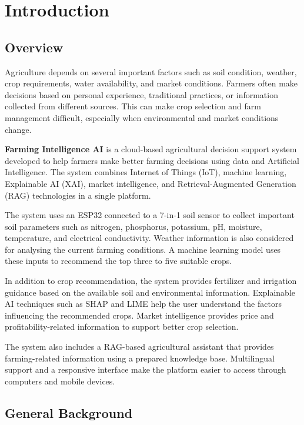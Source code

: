 \chapter{Introduction}

\section{Overview}

Agriculture depends on several important factors such as soil condition, weather, crop requirements, water availability, and market conditions. Farmers often make decisions based on personal experience, traditional practices, or information collected from different sources. This can make crop selection and farm management difficult, especially when environmental and market conditions change.

\textbf{Farming Intelligence AI} is a cloud-based agricultural decision support system developed to help farmers make better farming decisions using data and Artificial Intelligence. The system combines Internet of Things (IoT), machine learning, Explainable AI (XAI), market intelligence, and Retrieval-Augmented Generation (RAG) technologies in a single platform.

The system uses an ESP32 connected to a 7-in-1 soil sensor to collect important soil parameters such as nitrogen, phosphorus, potassium, pH, moisture, temperature, and electrical conductivity. Weather information is also considered for analysing the current farming conditions. A machine learning model uses these inputs to recommend the top three to five suitable crops.

In addition to crop recommendation, the system provides fertilizer and irrigation guidance based on the available soil and environmental information. Explainable AI techniques such as SHAP and LIME help the user understand the factors influencing the recommended crops. Market intelligence provides price and profitability-related information to support better crop selection.

The system also includes a RAG-based agricultural assistant that provides farming-related information using a prepared knowledge base. Multilingual support and a responsive interface make the platform easier to access through computers and mobile devices.

\section{General Background}

